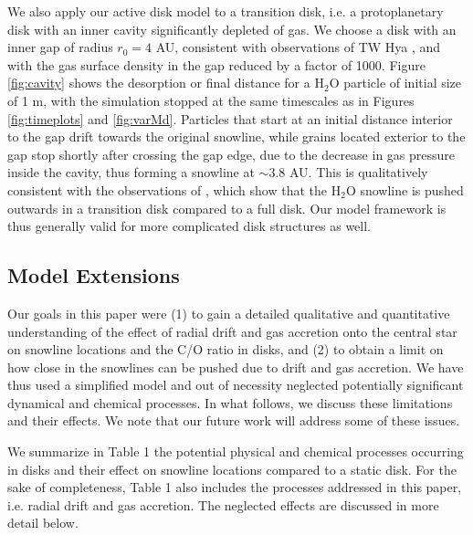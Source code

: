 \documentclass[apj]{emulateapj}
\begin{document}
We also apply our active disk model to a transition disk, i.e. a protoplanetary disk with an inner cavity significantly depleted of gas. We choose a disk with an inner gap of radius $r_0=4$ AU, consistent with observations of TW Hya \citep{zhang13}, and with the gas surface density in the gap reduced by a factor of 1000. Figure \ref{fig:cavity} shows the desorption or final distance for a H$_2$O particle of initial size of 1 m, with the simulation stopped at the same timescales as in Figures \ref{fig:timeplots} and \ref{fig:varMd}. Particles that start at an initial distance interior to the gap drift towards the original snowline, while grains located exterior to the gap stop shortly after crossing the gap edge, due to the decrease in gas pressure inside the cavity, thus forming a snowline at $\sim$$3.8$ AU. This is qualitatively consistent with the observations of \citet{zhang13}, which show that the H$_2$O snowline is pushed outwards in a transition disk compared to a full disk. Our model framework is thus generally valid for more complicated disk structures as well.  




\subsection{Model Extensions}
\label{sec:neglected}

Our goals in this paper were (1) to gain a detailed qualitative and quantitative understanding of the effect of radial drift and gas accretion onto the central star on snowline locations and the C/O ratio in disks, and (2) to obtain a limit on how close in the snowlines can be pushed due to drift and gas accretion. We have thus used a simplified model and out of necessity neglected potentially significant dynamical and chemical processes. In what follows, we discuss these limitations and their effects. We note that our future work will address some of these issues. 




We summarize in Table 1 the potential physical and chemical processes occurring in disks and their effect on snowline locations compared to a static disk. For the sake of completeness, Table 1 also includes the processes addressed in this paper, i.e. radial drift and gas accretion. The neglected effects are discussed in more detail below. 
\end{document}
